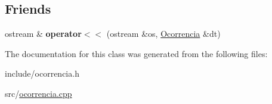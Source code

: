\subsection*{Friends}
\begin{DoxyCompactItemize}
\item 
\mbox{\label{classOcorrencia_a1c6c7fc44d22943413573dc92dd05313}} 
ostream \& {\bfseries operator$<$$<$} (ostream \&os, \hyperlink{classOcorrencia}{Ocorrencia} \&dt)
\end{DoxyCompactItemize}


The documentation for this class was generated from the following files\+:\begin{DoxyCompactItemize}
\item 
include/ocorrencia.\+h\item 
src/\hyperlink{ocorrencia_8cpp}{ocorrencia.\+cpp}\end{DoxyCompactItemize}
